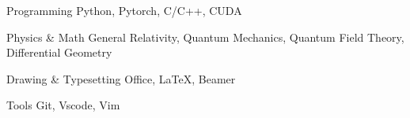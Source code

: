 \begin{cvskills}

  \cvskill
  {Programming} %
  {Python, Pytorch, C/C++, CUDA} %

  \cvskill
  {Physics \& Math} %
  {General Relativity, Quantum Mechanics, Quantum Field Theory, Differential Geometry} %

  \cvskill
  {Drawing \& Typesetting} %
  {Office, \textrm{\LaTeX}, Beamer} %

  \cvskill
  {Tools} %
  {Git, Vscode, Vim} %
\end{cvskills}
